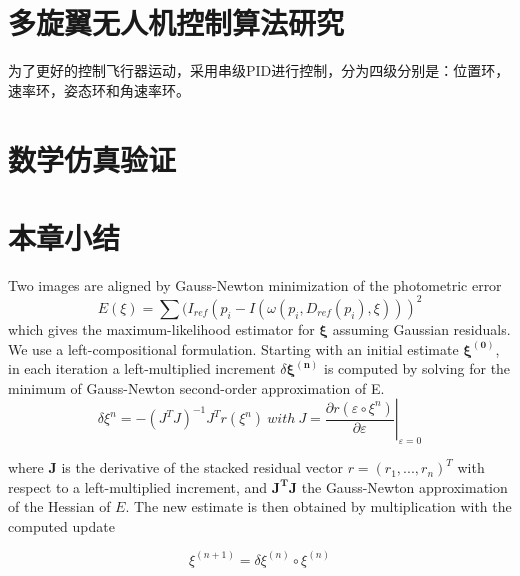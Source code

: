 \section{多旋翼无人机控制算法研究}
为了更好的控制飞行器运动，采用串级PID进行控制，分为四级分别是：位置环，速率环，姿态环和角速率环。

\section{ 数学仿真验证}



\section{本章小结}



\iffalse
Two images are aligned by Gauss-Newton minimization of the photometric error
\begin{equation}
E(\xi)=\sum( I_{ref}(p_{i} - I( \omega( p_{i},D_{ref}(p_{i}),\xi ) ))^{2}
\end{equation}
which gives the maximum-likelihood estimator for ${\mathbf{\xi }}$ assuming Gaussian residuals. We use a left-compositional formulation. Starting with an initial estimate ${{\mathbf{\xi }}^{{\mathbf{(0)}}}}$, in each iteration a left-multiplied increment $\delta {{\mathbf{\xi }}^{{\mathbf{(n)}}}}$ is computed by solving for the minimum of Gauss-Newton second-order approximation of E.
\begin{equation}
\delta\xi^{n}=-(J^{T}J)^{-1}J^{T}r(\xi^{n}) \ with \  \left. J=\frac{\partial r(\varepsilon\circ\xi^{n})}{\partial \varepsilon} \right|_{\varepsilon=0}
\end{equation}

where ${\mathbf{J}}$ is the derivative of the stacked residual vector ${ r=(r_{1},...,r_{n})^{T} }$ with respect to a left-multiplied increment, and ${{\mathbf{J}}^{\mathbf{T}}}{\mathbf{J}}$ the Gauss-Newton approximation of the Hessian of $E$. The new estimate is then obtained by multiplication with the computed update

\begin{equation}
\xi ^{(n + 1)} = \delta \xi ^{(n)} \circ \xi ^{(n)}
\end{equation}

